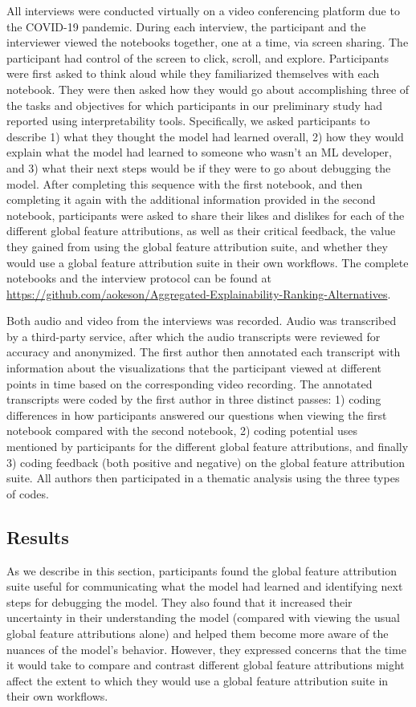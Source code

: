 \documentclass[11pt,dvipdfmx]{article}
\begin{document}
All interviews were conducted virtually on a video conferencing
platform due to the COVID-19 pandemic.  During each interview, the
participant and the interviewer viewed the notebooks together, one at
a time, via screen sharing. The participant had control of the screen
to click, scroll, and explore. Participants were first asked to think
aloud while they familiarized themselves with each notebook. They were
then asked how they would go about accomplishing three of the tasks
and objectives for which participants in our preliminary study had
reported using interpretability tools. Specifically, we asked
participants to describe 1) what they thought the model had learned
overall, 2) how they would explain what the model had learned to
someone who wasn't an ML developer, and 3) what their next steps would
be if they were to go about debugging the model. After completing this
sequence with the first notebook, and then completing it again with
the additional information provided in the second notebook,
participants were asked to share their likes and dislikes for each of
the different global feature attributions, as well as their critical
feedback, the value they gained from using the global feature
attribution suite, and whether they would use a global feature
attribution suite in their own workflows.  The complete notebooks and
the interview protocol can be found at
\url{https://github.com/aokeson/Aggregated-Explainability-Ranking-Alternatives}.

Both audio and video from the interviews was recorded.  Audio was
transcribed by a third-party service, after which the audio
transcripts were reviewed for accuracy and anonymized.  The first
author then annotated each transcript with information about the
visualizations that the participant viewed at different points in time
based on the corresponding video recording. The annotated transcripts
were coded by the first author in three distinct passes: 1) coding
differences in how participants answered our questions when viewing
the first notebook compared with the second notebook, 2) coding
potential uses mentioned by participants for the different global
feature attributions, and finally 3) coding feedback (both positive
and negative) on the global feature attribution suite. All authors
then participated in a thematic analysis using the three types of
codes.

\subsection{Results}
As we describe in this section, participants found the global feature
attribution suite useful for communicating what the model had learned
and identifying next steps for debugging the model. They also found
that it increased their uncertainty in their understanding the model
(compared with viewing the usual global feature attributions alone)
and helped them become more aware of the nuances of the model's
behavior. However, they expressed concerns that the time it would take
to compare and contrast different global feature attributions might
affect the extent to which they would use a global feature attribution
suite in their own workflows.
\end{document}
